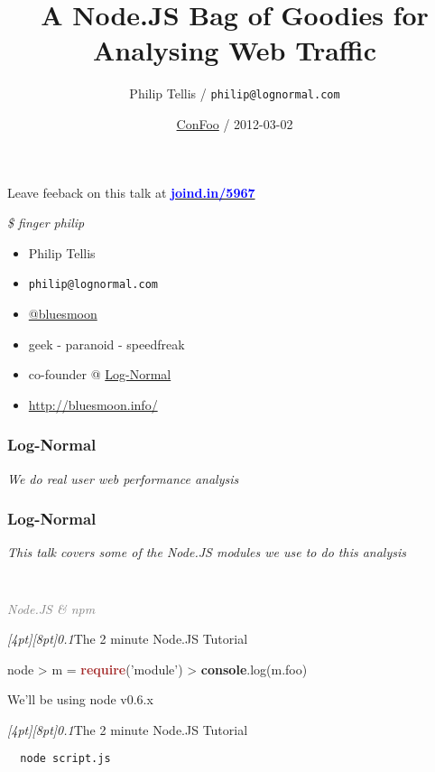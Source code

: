 \documentclass{beamer}
\author{Philip Tellis / \texttt{philip@lognormal.com}}
\title{A Node.JS Bag of Goodies for Analysing Web Traffic}
\date{\href{http://confoo.ca/}{ConFoo} / 2012-03-02}
\newcommand{\sn}[1]{\textrm{\textit{\Huge{\raisebox{-3pt}[4pt][8pt]{\textcolor{f2elblue}{#1}}}}}\hspace{4pt}}
\newcommand{\innersplash}[1]{
  \begin{center}
    \large \textrm{\textit{ #1 } }
  \end{center}
}
\newcommand{\splashslide}[2][{}]{
  \begin{frame}
  \frametitle{#1}
  \innersplash{#2}
  \end{frame}
}
\newcommand{\leadinslide}[2]{
  \splashslide{
     {\fontsize{150}{20}\selectfont{\raisebox{0pt}[90pt][0pt]{\textcolor{light-gray}{#1}}}} \\ \huge \textcolor{gray}{#2}
  }
}
\def\brown<#1>#2{\textcolor<#1>{brown}{\textbf<#1>{#2}}}
\def\green<#1>#2{\textcolor<#1>{dark-green}{\textbf<#1>{#2}}}
\def\blue<#1>#2{\textcolor<#1>{blue}{\textbf<#1>{#2}}}
\begin{document}
\begin{frame}
  \titlepage
\end{frame}


\begin{frame}
\begin{center}

  Leave feeback on this talk at \href{https://joind.in/5967}{\blue<1>{joind.in/5967}}
\end{center}
\end{frame}

\begin{frame}{\textit{\$ finger philip}}
  \begin{itemize}
  \item Philip Tellis
  \item \small{\texttt{philip@lognormal.com}}
  \item \href{http://twitter.com/bluesmoon}{@bluesmoon}
  \item geek - paranoid - speedfreak
  \item co-founder @ \href{http://www.lognormal.com/}{Log-Normal}
  \item \href{http://bluesmoon.info/}{http://bluesmoon.info/}
  \end{itemize}
\end{frame}

\splashslide[Log-Normal]{We do real user web performance analysis}

\splashslide[Log-Normal]{This talk covers some of the Node.JS modules we use to do this analysis}

\leadinslide{--}{Node.JS \& npm}

\begin{frame}[fragile]{\sn{0.1}The 2 minute Node.JS Tutorial}
\begin{semiverbatim}
  node
  > m = \brown<1>{require}('module')
  > \green<1>{console}.log(m.foo)
\end{semiverbatim}
We'll be using node v0.6.x
\end{frame}

\begin{frame}[fragile]{\sn{0.1}The 2 minute Node.JS Tutorial}
\begin{verbatim}
  node script.js
\end{verbatim}
\end{frame}
\end{document}
